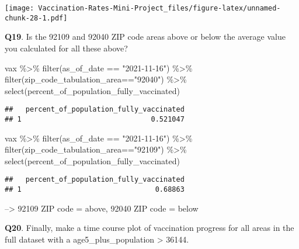 \documentclass[
]{article}
\newenvironment{Shaded}{\begin{snugshade}}{\end{snugshade}}
\newcommand{\FunctionTok}[1]{\textcolor[rgb]{0.00,0.00,0.00}{#1}}
\newcommand{\NormalTok}[1]{#1}
\newcommand{\SpecialCharTok}[1]{\textcolor[rgb]{0.00,0.00,0.00}{#1}}
\newcommand{\StringTok}[1]{\textcolor[rgb]{0.31,0.60,0.02}{#1}}
\begin{document}
\texttt{[image: Vaccination-Rates-Mini-Project\_files/figure-latex/unnamed-chunk-28-1.pdf]}

\textbf{Q19}. Is the 92109 and 92040 ZIP code areas above or below the
average value you calculated for all these above?

\begin{Shaded}
\begin{Highlighting}[]
\NormalTok{vax }\SpecialCharTok{\%\textgreater{}\%} \FunctionTok{filter}\NormalTok{(as\_of\_date }\SpecialCharTok{==} \StringTok{"2021{-}11{-}16"}\NormalTok{) }\SpecialCharTok{\%\textgreater{}\%}  
  \FunctionTok{filter}\NormalTok{(zip\_code\_tabulation\_area}\SpecialCharTok{==}\StringTok{"92040"}\NormalTok{) }\SpecialCharTok{\%\textgreater{}\%}
  \FunctionTok{select}\NormalTok{(percent\_of\_population\_fully\_vaccinated)}
\end{Highlighting}
\end{Shaded}

\begin{verbatim}
##   percent_of_population_fully_vaccinated
## 1                               0.521047
\end{verbatim}

\begin{Shaded}
\begin{Highlighting}[]
\NormalTok{vax }\SpecialCharTok{\%\textgreater{}\%} \FunctionTok{filter}\NormalTok{(as\_of\_date }\SpecialCharTok{==} \StringTok{"2021{-}11{-}16"}\NormalTok{) }\SpecialCharTok{\%\textgreater{}\%}  
  \FunctionTok{filter}\NormalTok{(zip\_code\_tabulation\_area}\SpecialCharTok{==}\StringTok{"92109"}\NormalTok{) }\SpecialCharTok{\%\textgreater{}\%}
  \FunctionTok{select}\NormalTok{(percent\_of\_population\_fully\_vaccinated)}
\end{Highlighting}
\end{Shaded}

\begin{verbatim}
##   percent_of_population_fully_vaccinated
## 1                                0.68863
\end{verbatim}

--\textgreater{} 92109 ZIP code = above, 92040 ZIP code = below

\textbf{Q20}. Finally, make a time course plot of vaccination progress
for all areas in the full dataset with a age5\_plus\_population
\textgreater{} 36144.
\end{document}
